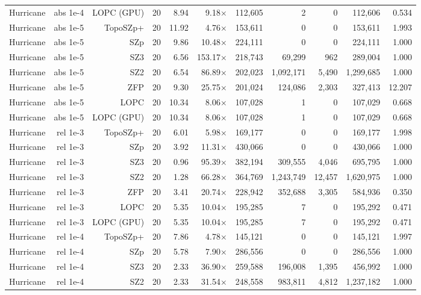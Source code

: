 \begin{tabular}{lrrrrrrrrrr}
Hurricane & abs 1e-4 & LOPC (GPU) & 20 & 8.94 & 9.18$\times$ & 112,605 & 2 & 0 & 112,606 & 0.534 \\
Hurricane & abs 1e-5 & TopoSZp+ & 20 & 11.92 & 4.76$\times$ & 153,611 & 0 & 0 & 153,611 & 1.993 \\
Hurricane & abs 1e-5 & SZp & 20 & 9.86 & 10.48$\times$ & 224,111 & 0 & 0 & 224,111 & 1.000 \\
Hurricane & abs 1e-5 & SZ3 & 20 & 6.56 & 153.17$\times$ & 218,743 & 69,299 & 962 & 289,004 & 1.000 \\
Hurricane & abs 1e-5 & SZ2 & 20 & 6.54 & 86.89$\times$ & 202,023 & 1,092,171 & 5,490 & 1,299,685 & 1.000 \\
Hurricane & abs 1e-5 & ZFP & 20 & 9.30 & 25.75$\times$ & 201,024 & 124,086 & 2,303 & 327,413 & 12.207 \\
Hurricane & abs 1e-5 & LOPC & 20 & 10.34 & 8.06$\times$ & 107,028 & 1 & 0 & 107,029 & 0.668 \\
Hurricane & abs 1e-5 & LOPC (GPU) & 20 & 10.34 & 8.06$\times$ & 107,028 & 1 & 0 & 107,029 & 0.668 \\
Hurricane & rel 1e-3 & TopoSZp+ & 20 & 6.01 & 5.98$\times$ & 169,177 & 0 & 0 & 169,177 & 1.998 \\
Hurricane & rel 1e-3 & SZp & 20 & 3.92 & 11.31$\times$ & 430,066 & 0 & 0 & 430,066 & 1.000 \\
Hurricane & rel 1e-3 & SZ3 & 20 & 0.96 & 95.39$\times$ & 382,194 & 309,555 & 4,046 & 695,795 & 1.000 \\
Hurricane & rel 1e-3 & SZ2 & 20 & 1.28 & 66.28$\times$ & 364,769 & 1,243,749 & 12,457 & 1,620,975 & 1.000 \\
Hurricane & rel 1e-3 & ZFP & 20 & 3.41 & 20.74$\times$ & 228,942 & 352,688 & 3,305 & 584,936 & 0.350 \\
Hurricane & rel 1e-3 & LOPC & 20 & 5.35 & 10.04$\times$ & 195,285 & 7 & 0 & 195,292 & 0.471 \\
Hurricane & rel 1e-3 & LOPC (GPU) & 20 & 5.35 & 10.04$\times$ & 195,285 & 7 & 0 & 195,292 & 0.471 \\
Hurricane & rel 1e-4 & TopoSZp+ & 20 & 7.86 & 4.78$\times$ & 145,121 & 0 & 0 & 145,121 & 1.997 \\
Hurricane & rel 1e-4 & SZp & 20 & 5.78 & 7.90$\times$ & 286,556 & 0 & 0 & 286,556 & 1.000 \\
Hurricane & rel 1e-4 & SZ3 & 20 & 2.33 & 36.90$\times$ & 259,588 & 196,008 & 1,395 & 456,992 & 1.000 \\
Hurricane & rel 1e-4 & SZ2 & 20 & 2.33 & 31.54$\times$ & 248,558 & 983,811 & 4,812 & 1,237,182 & 1.000 \\

\end{tabular}
